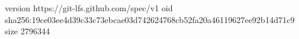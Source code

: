 version https://git-lfs.github.com/spec/v1
oid sha256:19ce03ee4d39c33c73ebcae03d742624768cb52fa20a46119627ee92b14d71c9
size 2796344
